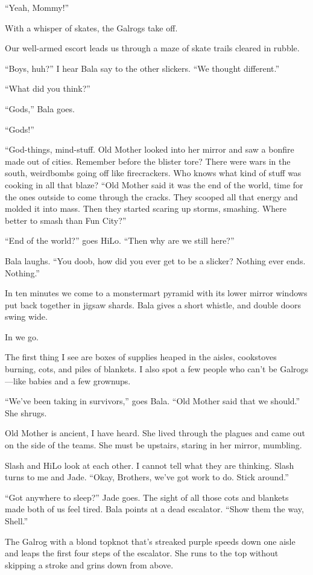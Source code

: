 ``Yeah, Mommy!''

With a whisper of skates, the Galrogs take off.

Our well-armed escort leads us through a maze of skate trails cleared in rubble.

``Boys, huh?'' I hear Bala say to the other slickers. ``We thought different.''

``What did you think?''

``Gods,'' Bala goes.

``Gods!''

``God-things, mind-stuff. Old Mother looked into her mirror and saw a bonfire made out of cities. Remember before the blister tore? There were wars in the south, weirdbombs going off like firecrackers. Who knows what kind of stuff was cooking in all that blaze? ``Old Mother said it was the end of the world, time for the ones outside to come through the cracks. They scooped all that energy and molded it into mass. Then they started scaring up storms, smashing. Where better to smash than Fun City?''

``End of the world?'' goes HiLo. ``Then why are we still here?''

Bala laughs. ``You doob, how did you ever get to be a slicker? Nothing ever ends. Nothing.''

In ten minutes we come to a monstermart pyramid with its lower mirror windows put back together in jigsaw shards. Bala gives a short whistle, and double doors swing wide.

In we go.

The first thing I see are boxes of supplies heaped in the aisles, cookstoves burning, cots, and piles of blankets. I also spot a few people who can't be Galrogs—like babies and a few grownups.

``We've been taking in survivors,'' goes Bala. ``Old Mother said that we should.'' She shrugs.

Old Mother is ancient, I have heard. She lived through the plagues and came out on the side of the teams. She must be upstairs, staring in her mirror, mumbling.

Slash and HiLo look at each other. I cannot tell what they are thinking. Slash turns to me and Jade.
``Okay, Brothers, we've got work to do. Stick around.''

``Got anywhere to sleep?'' Jade goes. The sight of all those cots and blankets made both of us feel tired.
Bala points at a dead escalator. ``Show them the way, Shell.''

The Galrog with a blond topknot that's streaked purple speeds down one aisle and leaps the first four steps of the escalator. She runs to the top without skipping a stroke and grins down from above.

